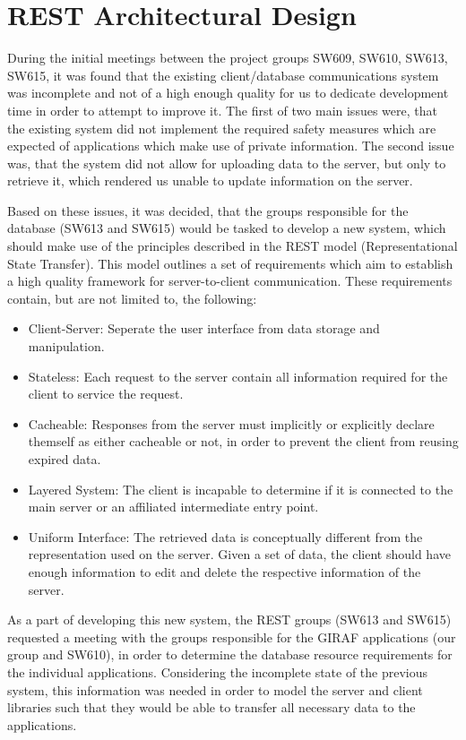 \chapter{REST Architectural Design}\label{S1CS}
During the initial meetings between the project groups SW609, SW610, SW613,
SW615, it was found that the existing client/database communications system was
incomplete and not of a high enough quality for us to dedicate development time
in order to attempt to improve it. The first of two main issues were, that the
existing system did not implement the required safety measures which are expected of
applications which make use of private information. The second issue was, that
the system did not allow for uploading data to the server, but only to
retrieve it, which rendered us unable to update information on the server.\nl

Based on these issues, it was decided, that the groups responsible for the
database (SW613 and SW615) would be tasked to develop a new system, which should
make use of the principles described in the REST model (Representational State
Transfer)\citep{RESTInfo}. This model outlines a set of requirements which aim
to establish a high quality framework for server-to-client communication. These
requirements contain, but are not limited to, the following:

\begin{itemize}
  \item Client-Server: Seperate the user interface from data storage and
  manipulation.
  \item Stateless: Each request to the server contain all information required
  for the client to service the request.
  \item Cacheable: Responses from the server must implicitly or explicitly
  declare themself as either cacheable or not, in order to prevent the client
  from reusing expired data.
  \item Layered System: The client is incapable to determine if it is connected
  to the main server or an affiliated intermediate entry point.
  \item Uniform Interface: The retrieved data is conceptually different from the
  representation used on the server. Given a set of data, the client should have
  enough information to edit and delete the respective information of the
  server. 
\end{itemize}

As a part of developing this new system, the REST groups (SW613 and SW615)
requested a meeting with the groups responsible for the GIRAF applications
(our group and SW610), in order to determine the database resource requirements
for the individual applications. Considering the incomplete state of the previous
system, this information was needed in order to model the server and client
libraries such that they would be able to transfer all necessary data to the
applications.\nl

